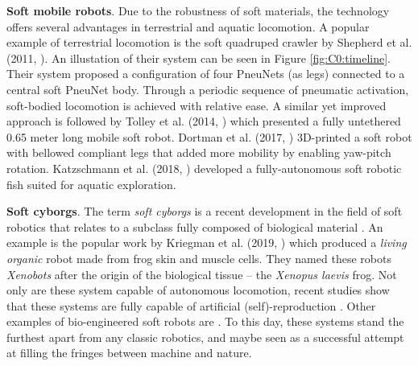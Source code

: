 \par \textbf{Soft mobile robots}. Due to the robustness of soft materials, the technology offers several advantages in terrestrial and aquatic locomotion. A popular example of terrestrial locomotion is the soft quadruped crawler by Shepherd et al. (2011, \cite{Shepherd2011Dec}). An illustation of their system can be seen in Figure \ref{fig:C0:timeline}. Their system proposed a configuration of four PneuNets (as legs) connected to a central soft PneuNet body. Through a periodic sequence of pneumatic activation, soft-bodied locomotion is achieved with relative ease. A similar yet improved approach is followed by Tolley et al. (2014, \cite{Tolley2014Sep}) which presented a fully untethered 0.65 meter long mobile soft robot. Dortman et al. (2017, \cite{Drotman2017}) 3D-printed a soft robot with bellowed compliant legs that added more mobility by enabling yaw-pitch rotation. Katzschmann et al. (2018, \cite{Katzschmann2018}) developed a fully-autonomous soft robotic fish suited for aquatic exploration.

\textbf{Soft cyborgs}. The term \textit{soft cyborgs} is a recent development in the field of soft robotics that relates to a subclass fully composed of biological material \cite{Rus2015}. An example is the popular work by Kriegman et al. (2019, \cite{Kriegman2019}) which produced a \textit{living organic} robot made from frog skin and muscle cells. They named these robots \textit{Xenobots} after the origin of the biological tissue -- the \textit{Xenopus laevis} frog. Not only are these system capable of autonomous locomotion, recent studies show that these systems are fully capable of artificial (self)-reproduction \cite{Kriegman2021Dec}. Other examples of bio-engineered soft robots are \cite{Ieropoulos2009Apr,Nawroth2012Aug}. To this day, these systems stand the furthest apart from any classic robotics, and maybe seen as a successful attempt at filling the fringes between machine and nature.

\vspace{-3mm}
